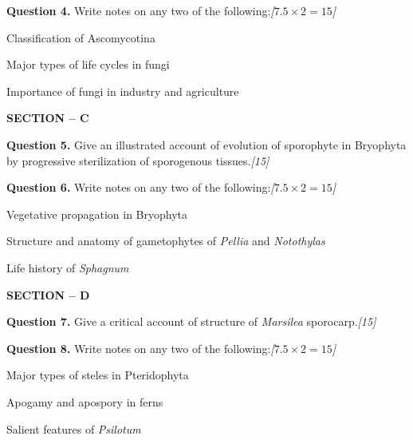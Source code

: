\documentclass[11pt,a4paper]{article}
\newcommand{\pts}[1]{\hfill   \textit{[#1]}}
\begin{document}
\noindent   \textbf{Question 4.} Write notes on any two of the following:\pts{$7.5  \times 2 = 15$}

\begin{parts}
  \item Classification of Ascomycotina
  \item Major types of life cycles in fungi
  \item Importance of fungi in industry and agriculture
\end{parts}

\bigskip

\begin{center}
   \textbf{SECTION -- C}
\end{center}

\medskip


\noindent   \textbf{Question 5.} Give an illustrated account of evolution of sporophyte in Bryophyta by progressive sterilization of sporogenous tissues.\pts{15}

\medskip


\noindent   \textbf{Question 6.} Write notes on any two of the following:\pts{$7.5  \times 2 = 15$}

\begin{parts}
  \item Vegetative propagation in Bryophyta
  \item Structure and anatomy of gametophytes of   \textit{Pellia} and   \textit{Notothylas}
  \item Life history of   \textit{Sphagnum}
\end{parts}

\bigskip

\begin{center}
   \textbf{SECTION -- D}
\end{center}

\medskip


\noindent   \textbf{Question 7.} Give a critical account of structure of   \textit{Marsilea} sporocarp.\pts{15}

\medskip


\noindent   \textbf{Question 8.} Write notes on any two of the following:\pts{$7.5  \times 2 = 15$}

\begin{parts}
  \item Major types of steles in Pteridophyta
  \item Apogamy and apospory in ferns
  \item Salient features of   \textit{Psilotum}
\end{parts}
\end{document}
